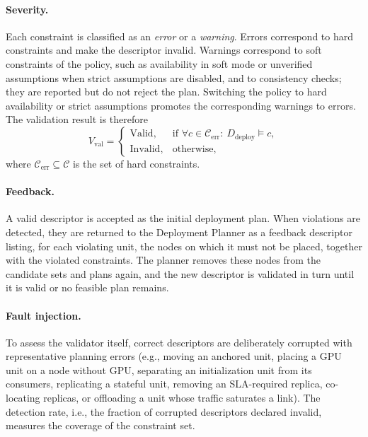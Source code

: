 \paragraph{Severity.}
Each constraint is classified as an \emph{error} or a \emph{warning}. Errors
correspond to hard constraints and make the descriptor invalid. Warnings
correspond to soft constraints of the policy, such as availability in soft
mode or unverified assumptions when strict assumptions are disabled, and to
consistency checks; they are reported but do not reject the plan. Switching the
policy to hard availability or strict assumptions promotes the corresponding
warnings to errors. The validation result is therefore
\begin{equation}
V_{\mathrm{val}} =
\begin{cases}
\mathrm{Valid}, & \text{if } \forall c\in\mathcal{C}_{\mathrm{err}}:\ D_{\mathrm{deploy}}\models c,\\
\mathrm{Invalid}, & \text{otherwise},
\end{cases}
\end{equation}
where $\mathcal{C}_{\mathrm{err}}\subseteq\mathcal{C}$ is the set of hard
constraints.

\paragraph{Feedback.}
A valid descriptor is accepted as the initial deployment plan. When violations
are detected, they are returned to the Deployment Planner as a feedback
descriptor listing, for each violating unit, the nodes on which it must not be
placed, together with the violated constraints. The planner removes these nodes
from the candidate sets and plans again, and the new descriptor is validated in
turn until it is valid or no feasible plan remains.

\paragraph{Fault injection.}
To assess the validator itself, correct descriptors are deliberately corrupted
with representative planning errors (e.g., moving an anchored unit, placing a
GPU unit on a node without GPU, separating an initialization unit from its
consumers, replicating a stateful unit, removing an SLA-required replica,
co-locating replicas, or offloading a unit whose traffic saturates a link).
The detection rate, i.e., the fraction of corrupted descriptors declared
invalid, measures the coverage of the constraint set.

